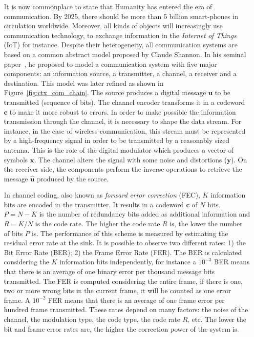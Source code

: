 It is now commonplace to state that Humanity has entered the era of
communication. By 2025, there should be more than 5 billion smart-phones in
circulation worldwide. Moreover, all kinds of objects will increasingly use
communication technology, to exchange information in the \emph{Internet of
Things} (IoT) for instance. Despite their heterogeneity, all communication
systems are based on a common abstract model proposed by Claude Shannon. In his
seminal paper~\cite{Shannon1948}, he proposed to model a communication system
with five major components: an information source, a transmitter, a channel, a
receiver and a destination. This model was later refined as shown in
Figure~\ref{fig:ctx_com_chain}. The source produces a digital message $\bm{u}$
to be transmitted (sequence of bits). The channel encoder transforms it in a
codeword $\bm{c}$ to make it more robust to errors. In order to make possible
the information transmission through the channel, it is necessary to shape the
data stream. For instance, in the case of wireless communication, this stream
must be represented by a high-frequency signal in order to be transmitted by a
reasonably sized antenna. This is the role of the digital modulator which
produces a vector of symbols $\bm{x}$. The channel alters the signal with some
noise and distortions ($\bm{y}$). On the receiver side, the components perform
the inverse operations to retrieve the message $\bm{\hat{u}}$ produced by the
source.

In channel coding, also known as \emph{forward error correction} (FEC), $K$
information bits  are encoded in the transmitter. It results in a codeword
$\bm{c}$ of $N$ bits. $P = N - K$ is the number of redundancy bits added as
additional information and $R = K/N$ is the code rate. The higher the code rate
$R$ is, the lower the number of bits $P$ is. The performance of this scheme is
measured by estimating the residual error rate at the sink. It is possible to
observe two different rates: 1) the Bit Error Rate (BER); 2) the Frame Error
Rate (FER). The BER is calculated considering the $K$ information bits
independently, for instance a $10^{-3}$ BER means that there is an average of
one binary error per thousand message bits transmitted. The FER is computed
considering the entire frame, if there is one, two or more wrong bits in the
current frame, it will be counted as one error frame. A $10^{-2}$ FER means that
there is an average of one frame error per hundred frame transmitted. These
rates depend on many factors: the noise of the channel, the modulation
type, the code type, the code rate $R$, etc. The lower the bit and frame error
rates are, the higher the correction power of the system is.

